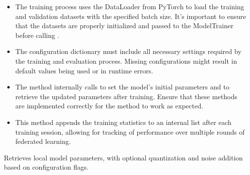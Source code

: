 \documentclass[letterpaper,10pt,english]{sphinxmanual}
\begin{document}
\begin{fulllineitems}
\begin{fulllineitems}
\begin{description}
\begin{itemize}
\item {} 
\sphinxAtStartPar
The training process uses the DataLoader from PyTorch to load the training and validation datasets with the specified batch size. It’s important to ensure that the datasets are properly initialized and passed to the ModelTrainer before calling .

\item {} 
\sphinxAtStartPar
The configuration dictionary must include all necessary settings required by the training and evaluation process. Missing configurations might result in default values being used or in runtime errors.

\item {} 
\sphinxAtStartPar
The method internally calls  to set the model’s initial parameters and  to retrieve the updated parameters after training. Ensure that these methods are implemented correctly for the  method to work as expected.

\item {} 
\sphinxAtStartPar
This method appends the training statistics to an internal list  after each training session, allowing for tracking of performance over multiple rounds of federated learning.

\end{itemize}

\end{description}

\end{fulllineitems}


\begin{fulllineitems}
\label{\detokenize{insur_FL_client:insur_FL_client.ClaimsFrequencyFLClient.get_parameters}}
\pysigstartsignatures
{}
\pysigstopsignatures
\sphinxAtStartPar
Retrieves local model parameters, with optional quantization and noise addition based on configuration flags.


\end{fulllineitems}
\end{fulllineitems}
\end{document}
